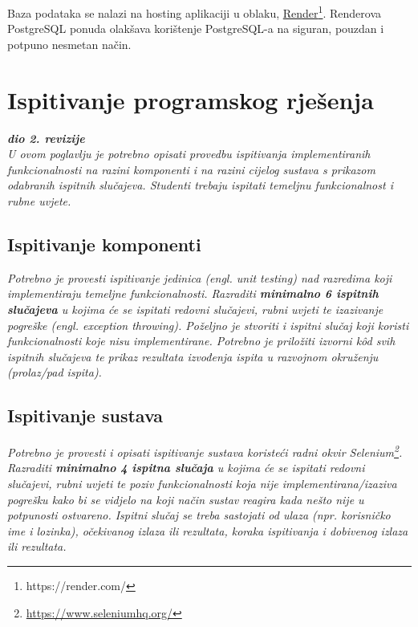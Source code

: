 			 Baza podataka se nalazi na hosting aplikaciji u oblaku, \underline{Render}\footnote{https://render.com/}. Renderova PostgreSQL ponuda olakšava korištenje PostgreSQL-a na siguran, pouzdan i potpuno nesmetan način.\\
			 			
			\eject 
		
	
		\section{Ispitivanje programskog rješenja}
			
			\textbf{\textit{dio 2. revizije}}\\
			
			 \textit{U ovom poglavlju je potrebno opisati provedbu ispitivanja implementiranih funkcionalnosti na razini komponenti i na razini cijelog sustava s prikazom odabranih ispitnih slučajeva. Studenti trebaju ispitati temeljnu funkcionalnost i rubne uvjete.}
	
			
			\subsection{Ispitivanje komponenti}
			\textit{Potrebno je provesti ispitivanje jedinica (engl. unit testing) nad razredima koji implementiraju temeljne funkcionalnosti. Razraditi \textbf{minimalno 6 ispitnih slučajeva} u kojima će se ispitati redovni slučajevi, rubni uvjeti te izazivanje pogreške (engl. exception throwing). Poželjno je stvoriti i ispitni slučaj koji koristi funkcionalnosti koje nisu implementirane. Potrebno je priložiti izvorni kôd svih ispitnih slučajeva te prikaz rezultata izvođenja ispita u razvojnom okruženju (prolaz/pad ispita). }
			
			
			
			\subsection{Ispitivanje sustava}
			
			 \textit{Potrebno je provesti i opisati ispitivanje sustava koristeći radni okvir Selenium\footnote{\url{https://www.seleniumhq.org/}}. Razraditi \textbf{minimalno 4 ispitna slučaja} u kojima će se ispitati redovni slučajevi, rubni uvjeti te poziv funkcionalnosti koja nije implementirana/izaziva pogrešku kako bi se vidjelo na koji način sustav reagira kada nešto nije u potpunosti ostvareno. Ispitni slučaj se treba sastojati od ulaza (npr. korisničko ime i lozinka), očekivanog izlaza ili rezultata, koraka ispitivanja i dobivenog izlaza ili rezultata.\\ }
			 

